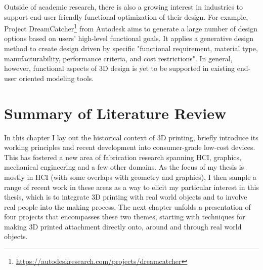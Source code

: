 Outside of academic research, there is also a growing interest in industries to support end-user friendly functional optimization of their design. For example, Project DreamCatcher\footnote{\url{https://autodeskresearch.com/projects/dreamcatcher}} from Autodesk aims to generate a large number of design options based on users' high-level functional goals. It applies a generative design method to create design driven by specific "functional requirement, material type, manufacturability, performance criteria, and cost restrictions". In general, however, functional aspects of 3D design is yet to be supported in existing end-user oriented modeling tools.


\section{Summary of Literature Review}
In this chapter I lay out the historical context of 3D printing, briefly introduce its working principles and recent development into consumer-grade low-cost devices. This has fostered a new area of fabrication research spanning HCI, graphics, mechanical engineering and a few other domains. As the focus of my thesis is mostly in HCI (with some overlaps with geometry and graphics), I then sample a range of recent work in these areas as a way to elicit my particular interest in this thesis, which is to integrate 3D printing with real world objects and to involve real people into the making process. The next chapter unfolds a presentation of four projects that encompasses these two themes, starting with techniques for making 3D printed attachment directly onto, around and through real world objects.